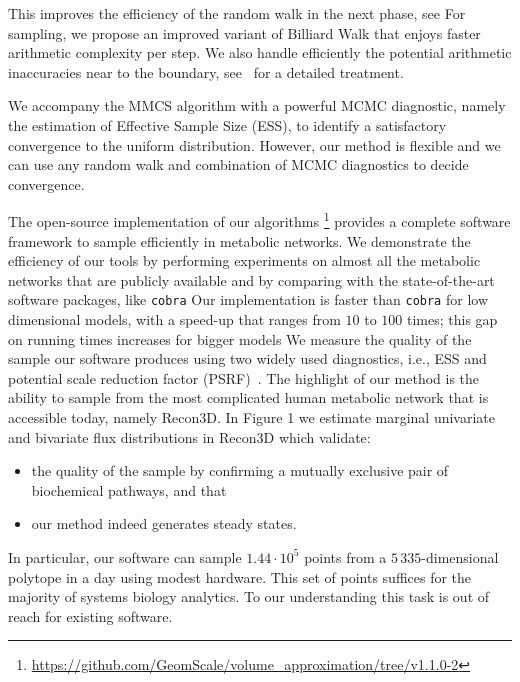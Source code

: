    This improves the efficiency of the random walk in the next phase, see
   For sampling, we propose an improved variant of Billiard Walk 
   that enjoys faster arithmetic complexity per step. 
   We also handle efficiently the potential arithmetic inaccuracies near to the boundary, see~\cite{ChePioCaz18} for a detailed treatment.

   We accompany the MMCS algorithm with a powerful MCMC diagnostic, namely the
   estimation of Effective Sample Size (ESS), to identify a satisfactory
   convergence to the uniform distribution. However, our method is flexible and we
   can use any random walk and combination of MCMC diagnostics to decide
   convergence.

   The open-source implementation of our algorithms%
   \footnote{\url{https://github.com/GeomScale/volume_approximation/tree/v1.1.0-2}} 
   provides a complete software framework to sample efficiently in metabolic networks. 
   We demonstrate the efficiency of our tools by performing experiments on almost all
   the metabolic networks that are publicly available and by comparing with the
   state-of-the-art software packages, like \texttt{cobra}
   Our implementation is faster than \texttt{cobra}
   for low dimensional models, with a speed-up that ranges from $10$ to $100$
   times; 
   this gap on running times increases for bigger models
   We measure the quality of the sample our software produces using two widely used diagnostics, i.e., ESS and potential scale reduction factor (PSRF)~\cite{Gelman92}. 
   The highlight of our method is the ability to sample from the most complicated human metabolic network that is accessible today, namely Recon3D. 
   In Figure 1 
   we estimate marginal univariate and bivariate flux distributions in Recon3D which validate: 

   \begin{itemize}
      \item the quality of the sample by confirming a mutually exclusive pair of biochemical pathways, and that
      \item our method indeed generates steady states. 
   \end{itemize} 
   
   In particular, our software can sample $1.44\cdot 10^5$ points from  a $5\,335$-dimensional polytope in a day using modest hardware. 
   This set of points suffices for the majority of systems biology analytics. 
   To our understanding this task is out of reach for existing software.

